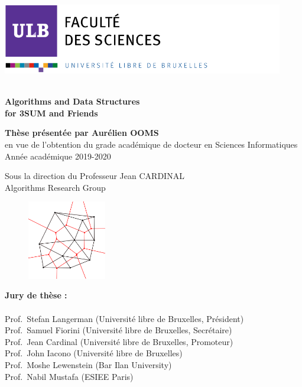 \documentclass[b5paper,12pt]{article}
\newcommand\blankpage{%
    \null
    \thispagestyle{empty}%
    \addtocounter{page}{-1}%
    \newpage}
\begin{document}
\includegraphics[width=12.3cm, height=3.07cm]{sciences.png} \\ \\

\begin{tcolorbox}
\color[rgb]{1,1,1}

\Large{\textbf{Algorithms and Data Structures\\ for 3SUM and Friends}}
\end{tcolorbox}

\begin{tcolorbox}[colback=white, halign=left]
\color{darkblue}
\large{\textbf{Thèse présentée par Aurélien OOMS}} \\
\color{black}
\small{en vue de l'obtention du grade académique de docteur en Sciences Informatiques \\
Année académique 2019-2020}

\vspace{2cm}

\begin{flushright}
\color{darkblue}
Sous la direction du Professeur Jean CARDINAL \\
\color{black}
Algorithms Research Group
\end{flushright}
\end{tcolorbox}
\vspace{4cm}


\begin{figure}
\includegraphics[width=3.45cm]{algorithms.png}
\end{figure}
\noindent
\textbf{Jury de thèse : } \\  \\
Prof.~Stefan Langerman (Université libre de Bruxelles, Président) \\
Prof.~Samuel Fiorini (Université libre de Bruxelles, Secrétaire) \\
Prof.~Jean Cardinal (Université libre de Bruxelles, Promoteur) \\
Prof.~John Iacono (Université libre de Bruxelles) \\
Prof.~Moshe Lewenstein (Bar Ilan University) \\
Prof.~Nabil Mustafa (ESIEE Paris) \\

\afterpage{\blankpage}
\end{document}
